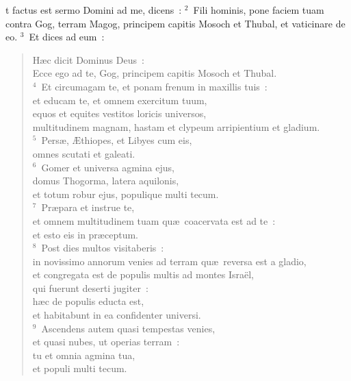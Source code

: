 \bchapter
{}t factus est sermo Domini ad me, dicens~:
${}^{2}$~Fili hominis, pone faciem tuam contra Gog, terram Magog, principem capitis Mosoch et Thubal, et vaticinare de eo.
${}^{3}$~Et dices ad eum~: \begin{verse}H\ae c dicit Dominus Deus~:\\ Ecce ego ad te, Gog, principem capitis Mosoch et Thubal.\\
${}^{4}$~Et circumagam te, et ponam frenum in maxillis tuis~:\\ et educam te, et omnem exercitum tuum,\\ equos et equites vestitos loricis universos,\\ multitudinem magnam, hastam et clypeum arripientium et gladium.\\
${}^{5}$~Pers\ae , \AE thiopes, et Libyes cum eis,\\ omnes scutati et galeati.\\
${}^{6}$~Gomer et universa agmina ejus,\\ domus Thogorma, latera aquilonis,\\ et totum robur ejus, populique multi tecum.\\
${}^{7}$~Pr\ae para et instrue te,\\ et omnem multitudinem tuam qu\ae\ coacervata est ad te~:\\ et esto eis in pr\ae ceptum.\\
${}^{8}$~Post dies multos visitaberis~:\\ in novissimo annorum venies ad terram qu\ae\ reversa est a gladio,\\ et congregata est de populis multis ad montes Isra\"el,\\ qui fuerunt deserti jugiter~:\\ h\ae c de populis educta est,\\ et habitabunt in ea confidenter universi.\\
${}^{9}$~Ascendens autem quasi tempestas venies,\\ et quasi nubes, ut operias terram~:\\ tu et omnia agmina tua,\\ et populi multi tecum.\end{verse}



